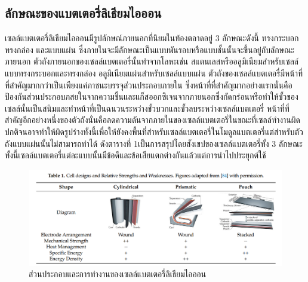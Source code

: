 \subsection{ลักษณะของแบตเตอรี่ลิเธียมไอออน}
เซลล์แบตเตอรี่ลิเธียมไอออนมีรูปลักษณ์ภายนอกที่นิยมในท้องตลาดอยู่ 3 ลักษณะดังนี้ ทรงกระบอก ทรงกล่อง และแบบแผ่น ซึ่งภายในจะมีลักษณะเป็นแบบพันรอบหรือแบบชั้นนั้นจะขึ้นอยู่กับลักษณะภายนอก\newline
ตัวถังภายนอกของเซลล์แบตเตอรี่นั้นทำจากโลหะเช่น สแตนเลสหรืออลูมิเนียมสำหรับเซลล์แบบทรงกระบอกและทรงกล่อง อลูมิเนียมแผ่นสำหรับเซลล์แบบแผ่น ตัวถังของเซลล์แบตเตอรี่มีหน้าที่ที่สำคัญมากกว่าเป็นเพียงแค่ภาชนะบรรจุส่วนประกอบภายใน ซึ่งหน้าที่ที่สำคัญมากอย่างแรกนั่นคือป้องกันส่วนประกอบภสยในจากความชื้นและแก็สออกซิเจนจากภายนอกซึ่งกัดกร่อนหรือทำให้ขั้วของเซลล์นั้นเป็นสนิมและทำหน้าที่เป็นฉนวนระหว่างขั้วบวกและขั้วลบระหว่างเซลล์แบตเตอรี่ หน้าที่ที่สำคัญอีกอย่างหนึ่งของตัวถังนั่นคือลดความดันจากภายในของเซลล์แบตเตอรี่ในขณะที่เซลล์ทำงานผิดปกติจนอาจทำให้ผิดรูปร่างทั้งนี้เพื่อให้ยังคงพื้นที่สำหรับเซลล์แบตเตอรี่ในโมดูลแบตเตอรี่แต่สำหรับตัวถังแบบแผ่นนั้นไม่สามารถทำได้\newline
ดังตารางที่ 1เป็นการสรุปโดยสังเขปของเซลล์แบตเตอรี่ทั้ง 3 ลักษณะทั้งนี้เซลล์แบตเตอรี่แต่ละแบบนั้นมีข้อดีและข้อเสียแตกต่างกันแล้วแต่การนำไปประยุกต์ใช้
\begin{center}
	\begin{figure}[!h]
		\includegraphics[width=0.6\linewidth]{Chapters/img/Compare_Cell.png}
			\centering
			\captionsetup{justification=centering,margin=2cm}
			\caption{ส่วนประกอบและการทำงานของเซลล์แบตเตอรี่ลิเธียมไอออน}
	\end{figure}
\end{center}
